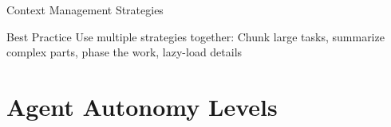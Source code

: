 \documentclass[aspectratio=169, 11pt]{beamer}
\begin{document}
\begin{frame}{Context Management Strategies}
    \vspace{0.3cm}
    \begin{block}{Best Practice}
        Use multiple strategies together: Chunk large tasks, summarize complex parts, phase the work, lazy-load details
    \end{block}

\end{frame}

\section{Agent Autonomy Levels}
\end{document}
